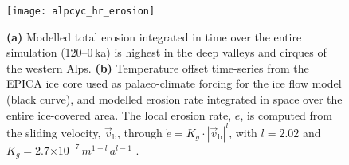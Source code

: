 \documentclass{article}
\newcommand{\e}[1]{\ensuremath{\times 10^{#1}}}
\begin{document}
    \begin{figure}
      \centerline{\texttt{[image: alpcyc\_hr\_erosion]}}
      \caption{%
        \textbf{(a)} Modelled total erosion integrated in time over the entire
        simulation (120--0\,ka) is highest in the deep valleys and cirques of
        the western Alps.
        \textbf{(b)} Temperature offset time-series from the EPICA ice core
        used as palaeo-climate forcing for the ice flow model (black curve),
        and modelled erosion rate integrated in space over the entire
        ice-covered area. The local erosion rate, $\dot{e}$, is computed from
        the sliding velocity, $\vec{v}_{\mathrm{b}}$, through
        $\dot{e} = K_g \cdot |\vec{v}_{\mathrm{b}}|^{l}$, with
        $l = 2.02$ and $K_g = 2.7\e{-7}\,m^{1-l}\,a^{l-1}$
        \citep{Herman.etal.2015}.}
      \label{fig:erosion}
    \end{figure}


\clearpage
\setcounter{table}{0}
\renewcommand{\thetable}{S\arabic{table}}%
\end{document}
